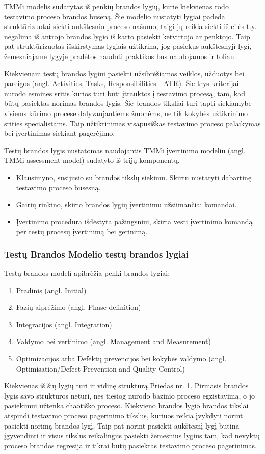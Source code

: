 \documentclass{VUMIFPSkursinis}
\begin{document}
TMMi modelis sudarytas iš penkių brandos lygių, kurie kiekvienas rodo testavimo proceso brandos būseną. Šie modelio nustatyti lygiai padeda struktūrizuotai siekti aukštesnio proceso našumo, taigi jų reikia siekti iš eilės t.y. negalima iš antrojo brandos lygio iš karto pasiekti ketvirtojo ar penktojo. Taip pat struktūrizuotas išskirstymas lygiais užtikrina, jog pasiekus aukštesnyjį lygį, žemesniajame lygyje pradėtos naudoti praktikos bus naudojamos ir toliau.

Kiekvienam testų brandos lygiui pasiekti užsibrėžiamos veiklos, užduotys bei pareigos (angl. Activities, Tasks, Responsibilities - ATR). Šie trys kriterijai nurodo esmines sritis kurios turi būti įtrauktos į testavimo procesą, tam, kad būtų pasiektas norimas brandos lygis. Šie brandos tiksliai turi tapti siekiamybe visiems kūrimo procese dalyvaujantiems žmonėms, ne tik kokybės užtikrinimo srities specialistams. Taip užtikrinimas visapusiškas testavimo proceso palaikymas bei įvertinimas siekiant pagerėjimo.

Testų brandos lygis nustatomas naudojantis TMMi įvertinimo modeliu (angl. TMMi assessment model) sudatyto iš trijų komponentų.
\begin{itemize}
   \item Klausimyno, susijusio su brandos tikslų siekimu. Skirtu nustatyti dabartinę testavimo proceso būsesną.
   \item Gairių rinkino, skirto brandos lygių įvertinimu užsiimančiai komandai.
   \item Įvertinimo procedūra išdėstyta pažingsniui, skirta vesti įvertinimo komandą per testų procesų įvertinimą bei gerinimą.
\end{itemize}

\subsubsection{Testų Brandos Modelio testų brandos lygiai}
Testų brandos modelį apibrėžia penki brandos lygiai\cite{Burnstein:2010:PST:1965566}:
\begin{enumerate}
   \item Pradinis (angl. Initial)
   \item Fazių aiprėžimo (angl. Phase definition)
   \item Integracijos (angl. Integration)
   \item Valdymo bei vertinimo (angl. Management and Measurement)
   \item Optimizacijos arba Defektų prevencijos bei kokybės valdymo (angl. Optimisation/Defect Prevention and Quality Control)
\end{enumerate}
Kiekvienas iš šių lygių turi ir vidinę struktūrą Priedas nr. 1. Pirmasis brandos lygis savo struktūros neturi, nes tiesiog nurodo bazinio proceso egzistavimą, o jo pasiekimui užtenka chaotiško proceso. Kiekvieno brandos lygio brandos tikslai atspindi testavimo proceso pagerinimo tikslus, kuriuos reikia įvykdyti norint pasiekti norimą brandos lygį. Taip pat norint pasiekti aukštesnį lygį būtina įgyvendinti ir visus tikslus reikalingus pasiekti žemesnius lygius tam, kad nevyktų proceso brandos regresija ir tikrai būtų pasiektas testavimo proceso pagerinimas.\cite{Tmmi}
\end{document}
